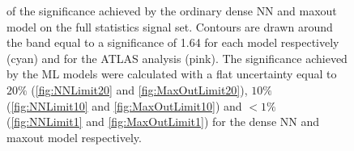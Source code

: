 \begin{figure}[H]
{    of the significance achieved by the ordinary dense \ac{NN} and maxout model on the full statistics signal set. Contours are drawn 
    around the band equal to a significance of 1.64 for each model respectively (cyan) and for the \ac{ATLAS} analysis \cite{atlas_search_2021} (pink). The 
    significance achieved by the \ac{ML} models were calculated with a flat uncertainty equal to $20\%$ (\ref{fig:NNLimit20} and \ref{fig:MaxOutLimit20}),
    $10\%$ (\ref{fig:NNLimit10} and \ref{fig:MaxOutLimit10}) and $<1\%$ (\ref{fig:NNLimit1} and \ref{fig:MaxOutLimit1}) for the dense \ac{NN} and maxout model
    respectively.}
\end{figure}